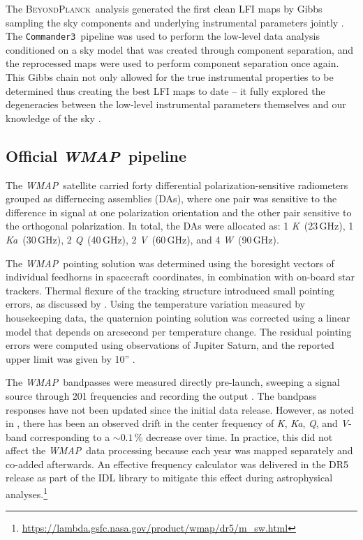 \documentclass[twocolumn]{../../common/aa}
\def\WMAP{\emph{WMAP}}
\def\commanderthree{\texttt{Commander3}}
\newcommand{\bp}{\textsc{BeyondPlanck}}
\newcommand{\K}[0]{\textit K}
\newcommand{\Ka}[0]{\textit{Ka}}
\newcommand{\Q}[0]{\textit Q}
\newcommand{\V}[0]{\textit V}
\newcommand{\W}[0]{\textit W}
\begin{document}
The \bp\ analysis generated the first clean LFI maps by Gibbs sampling the sky components and underlying instrumental parameters jointly \citep{bp01,bp03,bp10}. The \commanderthree\ pipeline was used to perform the low-level data analysis conditioned on a sky model that was created through component separation, and the reprocessed maps were used to perform component separation once again. This Gibbs chain not only allowed for the true instrumental properties to be determined thus creating the best LFI maps to date -- it fully explored the degeneracies between the low-level instrumental parameters themselves and our knowledge of the sky \citep{bp13,bp14}.

\subsection{Official \WMAP\ pipeline}
\label{sec:official_pipeline}

The \WMAP\ satellite carried forty differential polarization-sensitive
radiometers grouped as differnecing assemblies (DAs), where one pair was
sensitive to the difference in signal at one polarization orientation and the
other pair sensitive to the orthogonal polarization. In total, the DAs were
allocated as: 1 \K\ (23\,GHz), 1 \Ka\ (30\,GHz), 2 \Q\ (40\,GHz), 2 \V\
(60\,GHz), and 4 \W\ (90\,GHz).

The \WMAP\ pointing solution was determined using the boresight vectors of individual feedhorns in spacecraft coordinates, in combination with on-board star trackers. Thermal flexure of the tracking structure introduced small pointing errors, as discussed by \citet{jarosik2007}. Using the temperature variation measured by housekeeping data, the quaternion pointing solution was corrected using a linear model that depends on arcsecond per temperature change. The residual pointing errors were computed using observations of Jupiter Saturn, and the reported upper limit was given by 10'' \citep{bennett2012,wmapexsupp}.

The \WMAP\ bandpasses were measured directly pre-launch, sweeping a signal source through 201 frequencies and recording the output \citep{jarosik2003:MAP}. The bandpass responses have not been updated since the initial data release. However, as noted in \citet{bennett2012}, there has been an observed drift in the center frequency of \K, \Ka, \Q, and \V-band corresponding to a $\sim0.1\,\%$ decrease over time. In practice, this did not affect the \WMAP\ data processing because each year was mapped separately and co-added afterwards. An effective frequency calculator was delivered in the DR5 release as part of the IDL library to mitigate this effect during astrophysical analyses.\footnote{\url{https://lambda.gsfc.nasa.gov/product/wmap/dr5/m_sw.html}}
\end{document}
